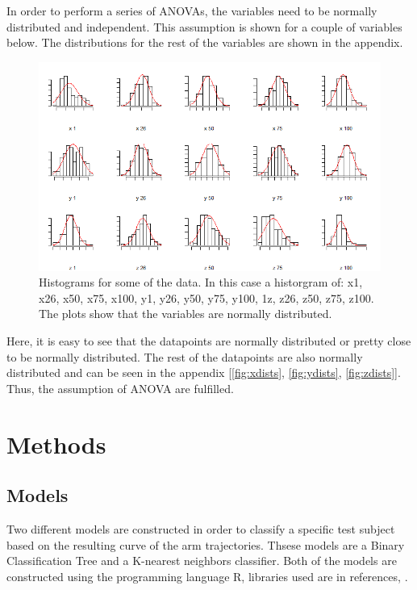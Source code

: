 \documentclass[11pt, fleqn, titlepage]{article}
\begin{document}
\noindent In order to perform a series of ANOVAs, the variables need to be normally distributed and independent. This assumption is shown for a couple of variables below. The distributions for the rest of the variables are shown in the appendix.

\begin{figure}[H]
	\centering
	\includegraphics[width=0.65\linewidth]{billeder/normalAF}
	\caption{Histograms for some of the data. In this case a historgram of: x1, x26, x50, x75, x100, y1, y26, y50, y75, y100, 1z, z26, z50, z75, z100. The plots show that the variables are normally distributed.}
	\label{fig:normalaf}
\end{figure}

\noindent Here, it is easy to see that the datapoints are normally distributed or pretty close to be normally distributed. The rest of the datapoints are also normally distributed and can be seen in the appendix [\ref{fig:xdists}, \ref{fig:ydists}, \ref{fig:zdists}]. Thus, the assumption of ANOVA are fulfilled.  

\section{Methods}

\subsection*{Models} \vspace*{-0.2cm}
Two different models are constructed in order to classify a specific test subject based on the resulting curve of the arm trajectories. Thsese models are a Binary Classification Tree and a K-nearest neighbors classifier. Both of the models are constructed using the programming language R, libraries used are in references, \cite{KNN, Tree}.
\vspace*{-0.2cm}
\end{document}
